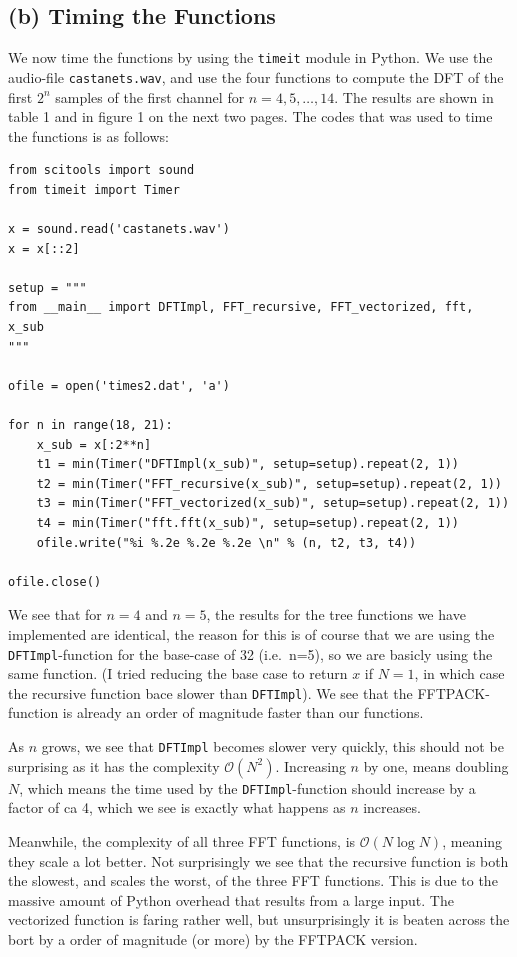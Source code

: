 \documentclass[a4paper, 11pt, notitlepage, english]{article}
\begin{document}
\subsection*{(b) Timing the Functions}
We now time the functions by using the \verb+timeit+ module in Python. We use the audio-file \verb+castanets.wav+, and use the four functions to compute the DFT of the first $2^n$ samples of the first channel for $n=4,5,\ldots, 14$. The results are shown in table 1 and in figure 1 on the next two pages. The codes that was used to time the functions is as follows:
\begin{lstlisting}
from scitools import sound
from timeit import Timer

x = sound.read('castanets.wav')
x = x[::2]

setup = """
from __main__ import DFTImpl, FFT_recursive, FFT_vectorized, fft, x_sub
"""

ofile = open('times2.dat', 'a')

for n in range(18, 21):
    x_sub = x[:2**n]
    t1 = min(Timer("DFTImpl(x_sub)", setup=setup).repeat(2, 1))
    t2 = min(Timer("FFT_recursive(x_sub)", setup=setup).repeat(2, 1))
    t3 = min(Timer("FFT_vectorized(x_sub)", setup=setup).repeat(2, 1))
    t4 = min(Timer("fft.fft(x_sub)", setup=setup).repeat(2, 1))
    ofile.write("%i %.2e %.2e %.2e \n" % (n, t2, t3, t4))

ofile.close()    
\end{lstlisting}

We see that for $n=4$ and $n=5$, the results for the tree functions we have implemented are identical, the reason for this is of course that we are using the \verb+DFTImpl+-function for the base-case of 32 (i.e.\ n=5), so we are basicly using the same function. (I tried reducing the base case to return $x$ if $N=1$, in which case the recursive function bace slower than \verb+DFTImpl+). We see that the FFTPACK-function is already an order of magnitude faster than our functions.

As $n$ grows, we see that \verb+DFTImpl+ becomes slower very quickly, this should not be surprising as it has the complexity $\mathcal{O}(N^2)$. Increasing $n$ by one, means doubling $N$, which means the time used by the \verb+DFTImpl+-function should increase by a factor of ca 4, which we see is exactly what happens as $n$ increases.

Meanwhile, the complexity of all three FFT functions, is $\mathcal{O}(N\log N)$, meaning they scale a lot better. Not surprisingly we see that the recursive function is both the slowest, and scales the worst, of the three FFT functions. This is due to the massive amount of Python overhead that results from a large input. The vectorized function is faring rather well, but unsurprisingly it is beaten across the bort by a order of magnitude (or more) by the FFTPACK version.
\end{document}
